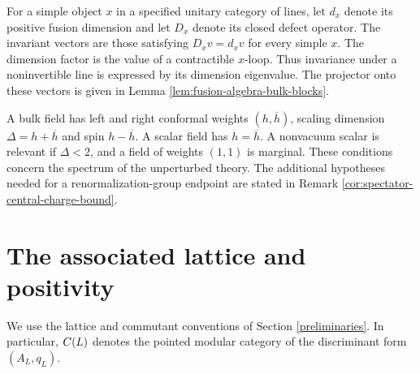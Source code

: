\documentclass[leqno]{article}
\let\cal\relax
\newcommand{\cal}{\mathcal}
\numberwithin{equation}{section}
\begin{document}
For a simple object $x$ in a specified unitary category of lines, let $d_x$ denote its positive fusion dimension and let $D_x$ denote its closed defect operator. The invariant vectors are those satisfying $D_xv = d_xv$ for every simple $x$. The dimension factor is the value of a contractible $x$-loop. Thus invariance under a noninvertible line is expressed by its dimension eigenvalue. The projector onto these vectors is given in Lemma \ref{lem:fusion-algebra-bulk-blocks}.

A bulk field has left and right conformal weights $(h,\overline h)$, scaling dimension $\Delta = h+\overline h$ and spin $h-\overline h$. A scalar field has $h = \overline h$. A nonvacuum scalar is relevant if $\Delta < 2$, and a field of weights $(1,1)$ is marginal. These conditions concern the spectrum of the unperturbed theory. The additional hypotheses needed for a renormalization-group endpoint are stated in Remark \ref{cor:spectator-central-charge-bound}.

\section{The associated lattice and positivity}
\label{sec:inputs}

We use the lattice and commutant conventions of Section \ref{preliminaries}. In particular, $\cal C(L)$ denotes the pointed modular category of the discriminant form $(A_L,q_L)$.
\end{document}
